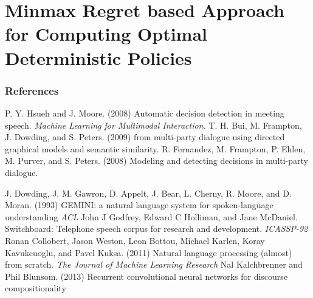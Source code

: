 \documentclass{beamer}
\begin{document}
\section{Minmax Regret based Approach for Computing Optimal Deterministic Policies}


\begin{frame}{}

\end{frame}


\begin{frame}
\frametitle{References}
\footnotesize{
\begin{thebibliography}{99} %
 P. Y. Hsueh and J. Moore. (2008)
\newblock Automatic decision detection in meeting speech.
\newblock \emph{Machine Learning for Multimodal Interaction.}
T. H. Bui, M. Frampton, J. Dowding, and S. Peters.   (2009)
\newblock from multi-party dialogue using directed graphical models and semantic similarity.
\newblock \emph{}
 R. Fernandez, M. Frampton, P. Ehlen, M. Purver, and S. Peters. (2008)
\newblock Modeling and detecting decisions in multi-party dialogue.
\newblock \emph{}

J. Dowding, J. M. Gawron, D. Appelt, J. Bear, L. Cherny,
R. Moore, and D. Moran. (1993)
\newblock GEMINI: a natural language system for spoken-language understanding
\newblock \emph{ACL}
John J Godfrey, Edward C Holliman, and Jane McDaniel.
\newblock Switchboard: Telephone speech corpus for research and development.
\newblock \emph{ICASSP-92}
Ronan Collobert, Jason Weston, Leon Bottou, Michael Karlen, Koray Kavukcuoglu, and Pavel Kuksa. (2011)
\newblock Natural language processing (almost) from scratch. 
\newblock \emph{The Journal of Machine Learning Research}
Nal Kalchbrenner and Phil Blunsom. (2013)
\newblock Recurrent convolutional neural networks for discourse compositionality
\newblock \emph{}

\end{thebibliography}
}
\end{frame}
\end{document}
